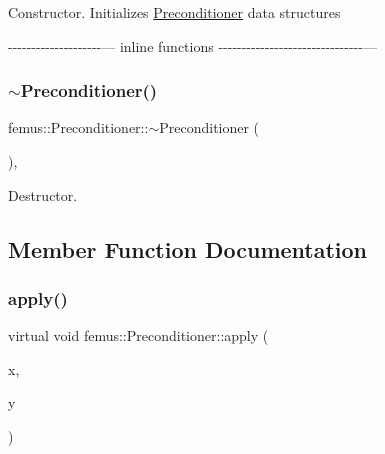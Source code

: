 Constructor. Initializes \mbox{\hyperlink{classfemus_1_1_preconditioner}{Preconditioner}} data structures

-\/-\/-\/-\/-\/-\/-\/-\/-\/-\/-\/-\/-\/-\/-\/-\/-\/-\/-\/-\/--- inline functions -\/-\/-\/-\/-\/-\/-\/-\/-\/-\/-\/-\/-\/-\/-\/-\/-\/-\/-\/-\/-\/-\/-\/-\/-\/-\/-\/-\/-\/-\/-\/--- \mbox{\label{classfemus_1_1_preconditioner_a7e3ce94fa42f0ca6a5c010caaef29e70}} 
\subsubsection{\texorpdfstring{$\sim$\+Preconditioner()}{~Preconditioner()}}
{\footnotesize\ttfamily femus\+::\+Preconditioner\+::$\sim$\+Preconditioner (\begin{DoxyParamCaption}{ }\end{DoxyParamCaption})\hspace{0.3cm}{\ttfamily [inline]}, {\ttfamily [virtual]}}

Destructor. 

\subsection{Member Function Documentation}
\mbox{\label{classfemus_1_1_preconditioner_adc1601a3f6350d3a8e906fc5616578c1}} 
\subsubsection{\texorpdfstring{apply()}{apply()}}
{\footnotesize\ttfamily virtual void femus\+::\+Preconditioner\+::apply (\begin{DoxyParamCaption}\item[{const \mbox{\hyperlink{classfemus_1_1_numeric_vector}{Numeric\+Vector}} \&}]{x,  }\item[{\mbox{\hyperlink{classfemus_1_1_numeric_vector}{Numeric\+Vector}} \&}]{y }\end{DoxyParamCaption})\hspace{0.3cm}{\ttfamily [pure virtual]}}

